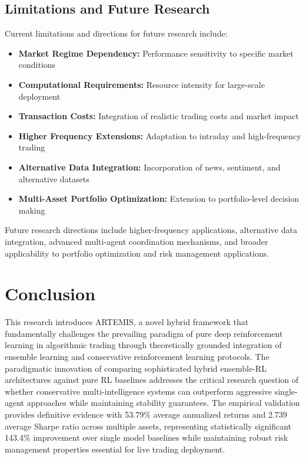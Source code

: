 \documentclass[10pt,twocolumn]{article}
\begin{document}
\subsection{Limitations and Future Research}

Current limitations and directions for future research include:

\begin{itemize}[itemsep=2pt, leftmargin=15pt]
\item \textbf{Market Regime Dependency:} Performance sensitivity to specific market conditions
\item \textbf{Computational Requirements:} Resource intensity for large-scale deployment  
\item \textbf{Transaction Costs:} Integration of realistic trading costs and market impact
\item \textbf{Higher Frequency Extensions:} Adaptation to intraday and high-frequency trading
\item \textbf{Alternative Data Integration:} Incorporation of news, sentiment, and alternative datasets
\item \textbf{Multi-Asset Portfolio Optimization:} Extension to portfolio-level decision making
\end{itemize}

Future research directions include higher-frequency applications, alternative data integration, advanced multi-agent coordination mechanisms, and broader applicability to portfolio optimization and risk management applications.

\section{Conclusion}

This research introduces ARTEMIS, a novel hybrid framework that fundamentally challenges the prevailing paradigm of pure deep reinforcement learning in algorithmic trading through theoretically grounded integration of ensemble learning and conservative reinforcement learning protocols. The paradigmatic innovation of comparing sophisticated hybrid ensemble-RL architectures against pure RL baselines addresses the critical research question of whether conservative multi-intelligence systems can outperform aggressive single-agent approaches while maintaining stability guarantees. The empirical validation provides definitive evidence with 53.79\% average annualized returns and 2.739 average Sharpe ratio across multiple assets, representing statistically significant 143.4\% improvement over single model baselines while maintaining robust risk management properties essential for live trading deployment.
\end{document}
